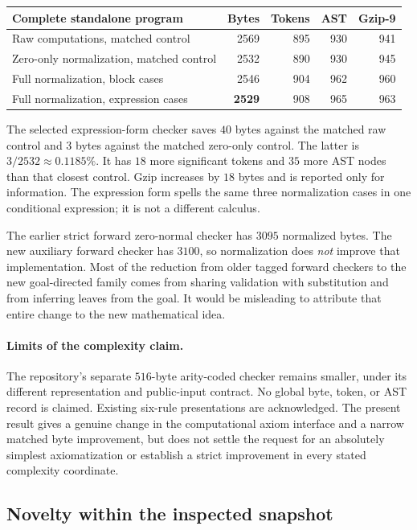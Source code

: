 \documentclass[11pt,letterpaper]{article}
\theoremstyle{definition}
\theoremstyle{remark}
\begin{document}
\begin{center}
\small
\begin{tabular}{@{}lrrrr@{}}
\toprule
Complete standalone program & Bytes & Tokens & AST & Gzip-9\\
\midrule
Raw computations, matched control & 2569 & 895 & 930 & 941\\
Zero-only normalization, matched control & 2532 & 890 & 930 & 945\\
Full normalization, block cases & 2546 & 904 & 962 & 960\\
Full normalization, expression cases & \textbf{2529} & 908 & 965 & 963\\
\bottomrule
\end{tabular}
\end{center}

The selected expression-form checker saves $40$ bytes against the matched
raw control and $3$ bytes against the matched zero-only control.
The latter is $3/2532\approx0.1185\%$. It has $18$ more significant tokens
and $35$ more AST nodes than that closest control. Gzip increases by
$18$ bytes and is reported only for information. The expression form spells
the same three normalization cases in one conditional expression; it is
not a different calculus.

The earlier strict forward zero-normal checker has $3095$ normalized bytes.
The new auxiliary forward checker has $3100$, so normalization does
\emph{not} improve that implementation. Most of the reduction from older
tagged forward checkers to the new goal-directed family comes from sharing
validation with substitution and from inferring leaves from the goal.
It would be misleading to attribute that entire change to the new
mathematical idea.

\paragraph{Limits of the complexity claim.}
The repository's separate $516$-byte arity-coded checker remains smaller,
under its different representation and public-input contract.
No global byte, token, or AST record is claimed. Existing six-rule
presentations are acknowledged. The present result gives a genuine change
in the computational axiom interface and a narrow matched byte improvement,
but does not settle the request for an absolutely simplest axiomatization
or establish a strict improvement in every stated complexity coordinate.

\subsection{Novelty within the inspected snapshot}
\end{document}

